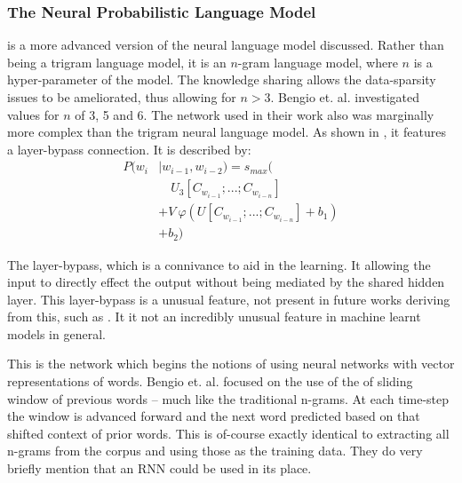 \documentclass[parskip]{komatufte}
\begin{document}
\subsubsection{The Neural Probabilistic Language Model}
 is a more advanced version of the neural language model discussed.
Rather than being a trigram language model, it is an $n$-gram language model, where $n$ is a hyper-parameter of the model.
The knowledge sharing allows the data-sparsity issues to be ameliorated, thus allowing for $n>3$.
%
%
Bengio et. al. investigated values for $n$ of 3, 5 and 6.
The network used in their work also was marginally more complex than the trigram neural language model.
As shown in ,
it features a layer-bypass connection.
It is described by:
\begin{align}
P(w_i & \mid w_{i-1}, w_{i-2}) = s_{max}( \nonumber
\\  & \quad U_3 \left[ C_{w_{i-1}};...; C_{w_{i-n}}\right] \nonumber
\\  & + V \: \varphi\left( U\left[C_{w_{i-1}};...; C_{w_{i-n}} \right] + b_1\right) \nonumber
\\  & +b_2)
\end{align}

The layer-bypass, which is a connivance to aid in the learning.
It allowing the input to directly effect the output without being mediated by the shared hidden layer.
This layer-bypass is a unusual feature, not present in future works deriving from this, such as .
It it not an incredibly unusual feature in machine learnt models in general.

This is the network which begins the notions of using neural networks with vector representations of words.
Bengio et. al. focused on the use of the of sliding window of previous words -- much like the traditional n-grams.
At each time-step the window is advanced forward and the next word predicted based on that shifted context of prior words.
This is of-course exactly identical to extracting all n-grams from the corpus and using those as the training data.
They do very briefly mention that an RNN could be used in its place.
\end{document}
